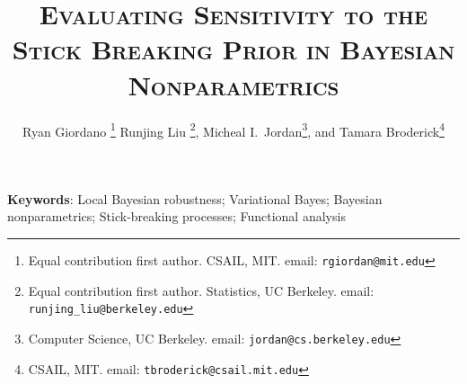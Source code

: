 \documentclass[12pt]{article}
\begin{document}

\title{\textsc{Evaluating Sensitivity to the Stick Breaking Prior in Bayesian Nonparametrics}} %


\author{
Ryan Giordano \footnote{Equal contribution first author.  CSAIL, MIT. email: \texttt{rgiordan@mit.edu}}
Runjing Liu \footnote{Equal contribution first author.  Statistics, UC Berkeley. email: \texttt{runjing\_liu@berkeley.edu}},
Micheal I.~Jordan\footnote{Computer Science, UC Berkeley. email: \texttt{jordan@cs.berkeley.edu}},
and Tamara Broderick\footnote{CSAIL, MIT. email: \texttt{tbroderick@csail.mit.edu}}\\
}

\date{\empty}
\maketitle



\begin{abstract}
    
\end{abstract}

\noindent\textbf{Keywords}:
{Local Bayesian robustness;
 Variational Bayes;
 Bayesian nonparametrics;
 Stick-breaking processes;
 Functional analysis}








\end{document}
